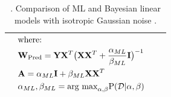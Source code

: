 \begin{table}[ht]
\begin{tabular}{|c|c|c|c|}
			  & $\begin{aligned} 
				  &\text{where:}\\
				  &\mathbf{W}_{\text{Pred}} = \mathbf{Y}\mathbf{X}^T\big{(}\mathbf{X}\mathbf{X}^T+\frac{\alpha_{ML}}{\beta_{ML}}\mathbf{I}\big{)}^{-1} \\
				  &\mathbf{A} =  \alpha_{ML}\mathbf{I}+\beta_{ML} \mathbf{X}\mathbf{X}^{T}\\
				  &\alpha_{ML},\beta_{ML} = \text{arg max}_{\alpha,\beta}\text{P}(\mathcal{D}|\alpha,\beta)
	         \end{aligned}$ \\
			\hline
		\end{tabular} 
		\setlength{\abovecaptionskip}{0.5cm}
		\small
		\caption{\label{tab:regressioncomparison}. Comparison of ML and Bayesian linear models with isotropic Gaussian noise .}
		\setlength{\belowcaptionskip}{0.cm}
	\end{table} 
	
